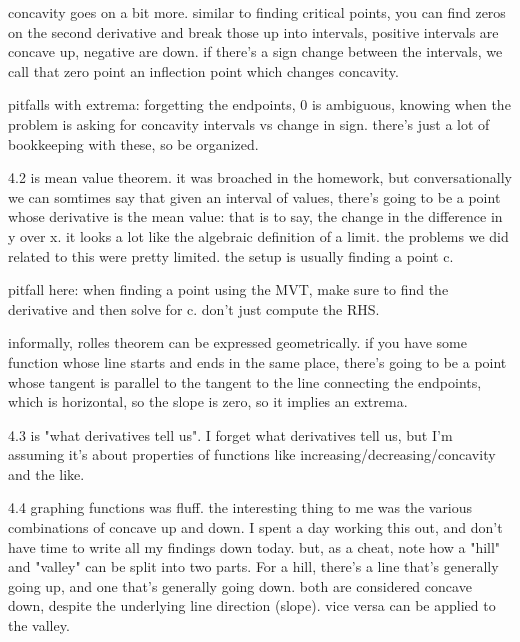 concavity goes on a bit more. similar to finding critical points, you can find zeros on the second derivative and break those up into intervals, positive intervals are concave up, negative are down. if there's a sign change between the intervals, we call that zero point an inflection point which changes concavity.
\par

pitfalls with extrema: forgetting the endpoints, 0 is ambiguous, knowing when the problem is asking for concavity intervals vs change in sign. there's just a lot of bookkeeping with these, so be organized.
\par

4.2 is mean value theorem. it was broached in the homework, but conversationally we can somtimes say that given an interval of values, there's going to be a point whose derivative is the mean value: that is to say, the change in the difference in y over x. it looks a lot like the algebraic definition of a limit. the problems we did related to this were pretty limited. the setup is usually finding a point c.
\par

pitfall here: when finding a point using the MVT, make sure to find the derivative and then solve for c. don't just compute the RHS.
\par

informally, rolles theorem can be expressed geometrically. if you have some function whose line starts and ends in the same place, there's going to be a point whose tangent is parallel to the tangent to the line connecting the endpoints, which is horizontal, so the slope is zero, so it implies an extrema.
\par

4.3 is "what derivatives tell us". I forget what derivatives tell us, but I'm assuming it's about properties of functions like increasing/decreasing/concavity and the like.
\par

4.4 graphing functions was fluff. the interesting thing to me was the various combinations of concave up and down. I spent a day working this out, and don't have time to write all my findings down today. but, as a cheat, note how a "hill" and "valley" can be split into two parts. For a hill, there's a line that's generally going up, and one that's generally going down. both are considered concave down, despite the underlying line direction (slope). vice versa can be applied to the valley.
\par

